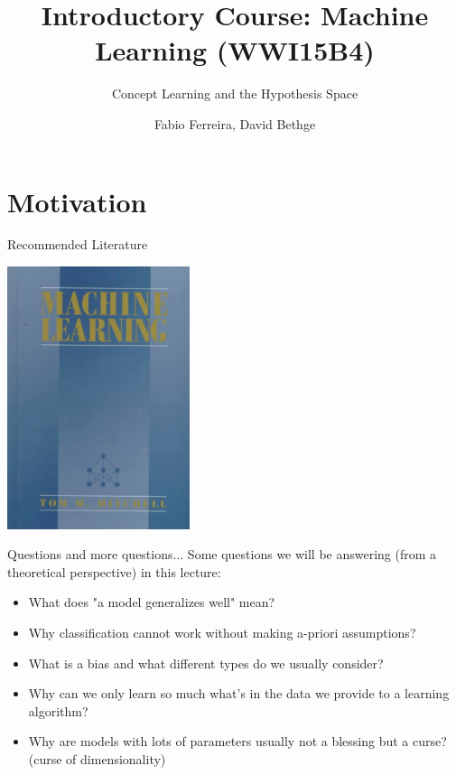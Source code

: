 \documentclass{beamer}
\title[]{Introductory Course: Machine Learning (WWI15B4)}
\subtitle{Concept Learning and the Hypothesis Space}
\author{Fabio Ferreira, David Bethge}
\institute{DHBW Karlsruhe}
\date{}
\begin{document}
%
%

\begin{frame}
  \titlepage
\end{frame}

\section{Motivation}
\begin{frame}{Recommended Literature}
\begin{center}
\includegraphics[width=0.4\textwidth]{mitchell_ml}
\end{center}
\end{frame}

\begin{frame}
\tableofcontents
\end{frame}

\begin{frame}{Questions and more questions...}
Some questions we will be answering (from a theoretical perspective) in this lecture:
\begin{itemize}
\item What does "a model generalizes well" mean?
\item Why classification cannot work without making a-priori assumptions?
\item What is a bias and what different types do we usually consider?
\item Why can we only learn so much what's in the data we provide to a learning algorithm?
\item Why are models with lots of parameters usually not a blessing but a curse? (curse of dimensionality)
\end{itemize}
\end{frame}
\end{document}
